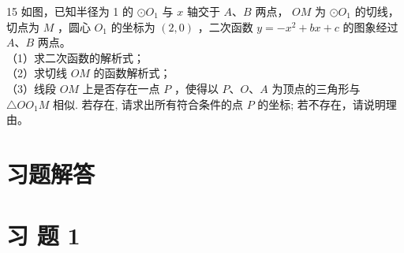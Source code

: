 \documentclass[10pt]{article}
\begin{document}
15 如图，已知半径为 1 的 $\odot O_{1}$ 与 $x$ 轴交于 $A 、 B$ 两点， $O M$ 为 $\odot O_{1}$ 的切线，切点为 $M$ ，圆心 $O_{1}$ 的坐标为 $(2,0)$ ，二次函数 $y=-x^{2}+b x+c$ 的图象经过 $A 、 B$ 两点。\\
（1）求二次函数的解析式；\\
（2）求切线 $O M$ 的函数解析式；\\
（3）线段 $O M$ 上是否存在一点 $P$ ，使得以 $P 、 O 、 A$ 为顶点的三角形与 $\triangle O O_{1} M$ 相似. 若存在, 请求出所有符合条件的点 $P$ 的坐标; 若不存在，请说明理由。

\section*{习题解答}
\section*{习 题 1}
\end{document}
